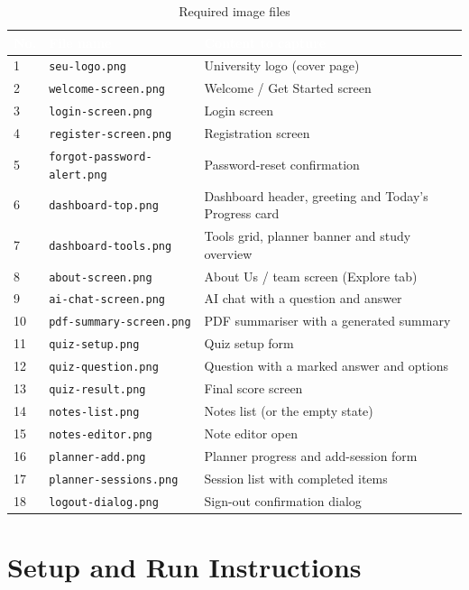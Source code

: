 \documentclass[12pt,a4paper,oneside]{report}
\begin{document}
\begin{table}[H]
\centering
\caption{Required image files}
\label{tab:images}
\small
\begin{tabularx}{\textwidth}{@{}p{1.1cm}p{6.2cm}X@{}}
\toprule
\rowcolor{tblhead} \textcolor{white}{\textbf{No.}} &
\textcolor{white}{\textbf{File name}} &
\textcolor{white}{\textbf{Content to capture}} \\
\midrule
1  & \texttt{seu-logo.png} & University logo (cover page) \\
2  & \texttt{welcome-screen.png} & Welcome / Get Started screen \\
3  & \texttt{login-screen.png} & Login screen \\
4  & \texttt{register-screen.png} & Registration screen \\
5  & \texttt{forgot-password-alert.png} & Password-reset confirmation \\
6  & \texttt{dashboard-top.png} & Dashboard header, greeting and Today's Progress card \\
7  & \texttt{dashboard-tools.png} & Tools grid, planner banner and study overview \\
8  & \texttt{about-screen.png} & About Us / team screen (Explore tab) \\
9  & \texttt{ai-chat-screen.png} & AI chat with a question and answer \\
10 & \texttt{pdf-summary-screen.png} & PDF summariser with a generated summary \\
11 & \texttt{quiz-setup.png} & Quiz setup form \\
12 & \texttt{quiz-question.png} & Question with a marked answer and options \\
13 & \texttt{quiz-result.png} & Final score screen \\
14 & \texttt{notes-list.png} & Notes list (or the empty state) \\
15 & \texttt{notes-editor.png} & Note editor open \\
16 & \texttt{planner-add.png} & Planner progress and add-session form \\
17 & \texttt{planner-sessions.png} & Session list with completed items \\
18 & \texttt{logout-dialog.png} & Sign-out confirmation dialog \\
\bottomrule
\end{tabularx}
\end{table}

\chapter{Setup and Run Instructions}
\end{document}
